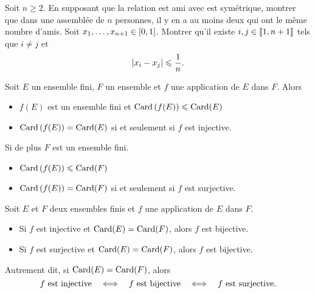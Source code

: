 \documentclass{magnolia}
\begin{document}

\begin{exos}
\exo Soit $n \geq 2$. En supposant que la relation \og est ami avec \fg est
  symétrique, montrer que dans une assemblée de $n$ personnes, il y en a au moins deux qui
  ont le même nombre d'amis.
\exo Soit $x_1,\ldots,x_{n+1}\in\left[0,1\right]$. Montrer qu'il existe
  $i,j\in\left\llbracket 1,n+1\right\rrbracket$ tels que $i\neq j$ et
  \[\left|x_i-x_j\right|\leqslant\frac{1}{n}.\]
%

\end{exos}

\begin{proposition}
Soit $E$ un ensemble fini, $F$ un ensemble et $f$ une application de $E$ dans
$F$. Alors
\begin{itemize}
\item $f(E)$ est un ensemble fini et $\operatorname{Card}\left(f(E)\right) \leqslant \operatorname{Card}(E)$
\item $\operatorname{Card}\left(f(E)\right)=\operatorname{Card}(E)$ si et seulement si $f$ est injective.
\end{itemize}
Si de plus $F$ est un ensemble fini.
\begin{itemize}
\item $\operatorname{Card}\left(f(E)\right)\leqslant\operatorname{Card}(F)$
\item $\operatorname{Card}\left(f(E)\right)=\operatorname{Card}(F)$ si et seulement si $f$ est surjective.
\end{itemize}
\end{proposition}





\begin{proposition}
Soit $E$ et $F$ deux ensembles finis et $f$ une application de $E$ dans $F$.
\begin{itemize}
\item Si $f$ est injective et $\operatorname{Card}(E)=\operatorname{Card}(F)$, alors $f$ est bijective.
\item Si $f$ est surjective et $\operatorname{Card}(E)=\operatorname{Card}(F)$, alors $f$ est bijective.
\end{itemize}
Autrement dit, si $\operatorname{Card}(E)=\operatorname{Card}(F)$, alors
\[\text{$f$ est injective} \quad\Longleftrightarrow\quad \text{$f$ est bijective} \quad\Longleftrightarrow\quad
  \text{$f$ est surjective}.\]
\end{proposition}
\end{document}
